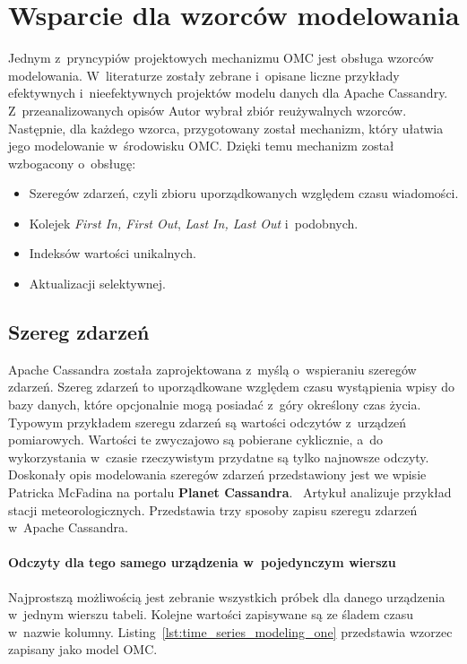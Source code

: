 \section{Wsparcie dla wzorców modelowania}
\label{sec:ocm_data_modeling_support}

Jednym z~pryncypiów projektowych mechanizmu OMC jest obsługa wzorców modelowania. W~literaturze zostały zebrane i~opisane liczne przykłady efektywnych i~nieefektywnych projektów modelu danych dla Apache Cassandry. Z~przeanalizowanych opisów Autor wybrał zbiór reużywalnych wzorców. Następnie, dla każdego wzorca, przygotowany został mechanizm, który ułatwia jego modelowanie w~środowisku OMC. Dzięki temu mechanizm został wzbogacony o~obsługę:

\begin{itemize}
	\item Szeregów zdarzeń, czyli zbioru uporządkowanych względem czasu wiadomości.
	\item Kolejek \emph{First In, First Out}, \emph{Last In, Last Out} i~podobnych.
	\item Indeksów wartości unikalnych. 
	\item Aktualizacji selektywnej.
\end{itemize}

\subsection{Szereg zdarzeń}

Apache Cassandra została zaprojektowana z~myślą o~wspieraniu szeregów zdarzeń. Szereg zdarzeń to uporządkowane względem czasu wystąpienia wpisy do bazy danych, które opcjonalnie mogą posiadać z~góry określony czas życia. Typowym przykładem szeregu zdarzeń są wartości odczytów z~urządzeń pomiarowych. Wartości te zwyczajowo są pobierane cyklicznie, a~do wykorzystania w~czasie rzeczywistym przydatne są tylko najnowsze odczyty. Doskonały opis modelowania szeregów zdarzeń przedstawiony jest we wpisie Patricka McFadina na portalu \textbf{Planet Cassandra}.~\cite{time_series_modeling_pattern} Artykuł analizuje przykład stacji meteorologicznych. Przedstawia trzy sposoby zapisu szeregu zdarzeń w~Apache Cassandra. 

\paragraph{Odczyty dla tego samego urządzenia w~pojedynczym wierszu} 

Najprostszą możliwością jest zebranie wszystkich próbek dla danego urządzenia w~jednym wierszu tabeli. Kolejne wartości zapisywane są ze śladem czasu w~nazwie kolumny. Listing~\ref{lst:time_series_modeling_one} przedstawia wzorzec zapisany jako model OMC.

